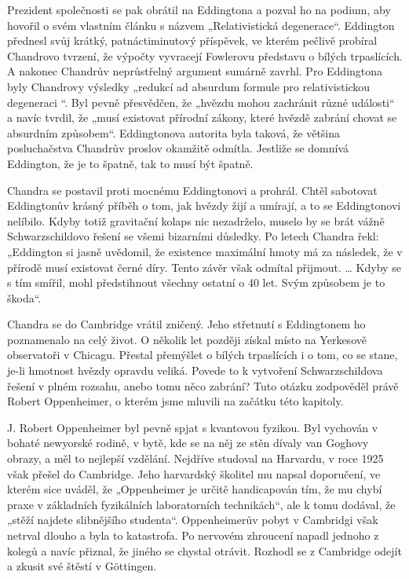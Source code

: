   Prezident společnosti se pak obrátil na Eddingtona a pozval ho na podium, aby hovořil o svém
  vlastním článku s názvem „Relativistická degenerace“. Eddington přednesl svůj krátký,
  patnáctiminutový příspěvek, ve kterém pečlivě probíral Chandrovo tvrzení, že výpočty vyvracejí
  Fowlerovu představu o bílých trpaslících. A nakonec Chandrův neprůstřelný argument sumárně zavrhl.
  Pro Eddingtona byly Chandrovy výsledky „redukcí ad absurdum formule pro relativistickou degeneraci
  “. Byl pevně přesvědčen, že „hvězdu mohou zachránit různé události“ a navíc tvrdil, že „musí
  existovat přírodní zákony, které hvězdě zabrání chovat se absurdním způsobem“. Eddingtonova
  autorita byla taková, že většina posluchačstva Chandrův proslov okamžitě odmítla. Jestliže se
  domnívá Eddington, že je to špatně, tak to musí být špatně. 
  
  Chandra se postavil proti mocnému Eddingtonovi a prohrál. Chtěl sabotovat Eddingtonův krásný
  příběh o tom, jak hvězdy žijí a umírají, a to se Eddingtonovi nelíbilo. Kdyby totiž gravitační
  kolaps nic nezadrželo, muselo by se brát vážně Schwarzschildovo řešení se všemi bizarními
  důsledky. Po letech Chandra řekl: „Eddington si jasně uvědomil, že existence maximální hmoty má za
  následek, že v přírodě musí existovat černé díry. Tento závěr však odmítal přijmout. … Kdyby se s
  tím smířil, mohl předstihnout všechny ostatní o 40 let. Svým způsobem je to škoda“. 
  
  Chandra se do Cambridge vrátil zničený. Jeho střetnutí s Eddingtonem ho poznamenalo na celý život.
  O několik let později získal místo na Yerkesově observatoři v Chicagu. Přestal přemýšlet o bílých
  trpaslících i o tom, co se stane, je-li hmotnost hvězdy opravdu veliká. Povede to k vytvoření
  Schwarzschildova řešení v plném rozsahu, anebo tomu něco zabrání? Tuto otázku zodpověděl právě
  Robert Oppenheimer, o kterém jsme mluvili na začátku této kapitoly. 
  
  J. Robert Oppenheimer byl pevně spjat s kvantovou fyzikou. Byl vychován v bohaté newyorské rodině,
  v bytě, kde se na něj ze stěn dívaly van Goghovy obrazy, a měl to nejlepší vzdělání. Nejdříve
  studoval na Harvardu, v roce 1925 však přešel do Cambridge. Jeho harvardský školitel mu napsal
  doporučení, ve kterém sice uváděl, že „Oppenheimer je určitě handicapován tím, že mu chybí praxe v
  základních fyzikálních laboratorních technikách“, ale k tomu dodával, že „stěží najdete
  slibnějšího studenta“. Oppenheimerův pobyt v Cambridgi však netrval dlouho  a byla to katastrofa.
  Po nervovém zhroucení napadl jednoho z kolegů a navíc přiznal, že jiného se chystal otrávit.
  Rozhodl se z Cambridge odejít a zkusit své štěstí v Göttingen. 
  
